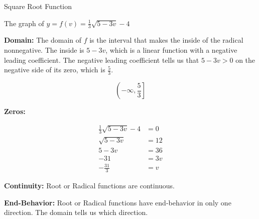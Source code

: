 \documentclass{ximera}
\begin{document}
\begin{example} Square Root Function

The graph of $y = f(v) = \frac{1}{3} \sqrt{5-3v}-4$


\begin{image}
\end{image}

\textbf{Domain:} The domain of $f$ is the interval that makes the inside of the radical nonnegative.  The inside is $5-3v$, which is a linear function with a negative leading coefficient. The negative leading coefficient tells us that $5-3v > 0$ on the negative side of its zero, which is $\frac{5}{3}$.

\[ \left(-\infty, \frac{5}{3} \right] \]

\textbf{Zeros:}


\begin{align*}
\frac{1}{3} \sqrt{5-3v}-4 & = 0   \\
\sqrt{5-3v}               & = 12  \\
5-3v                      & = 36  \\
-31 &= 3v   \\
-\frac{31}{3}   &= v
\end{align*}


\textbf{Continuity:} Root or Radical functions are continuous.


\textbf{End-Behavior:} Root or Radical functions have end-behavior in only one direction. The domain tells us which direction.  


\end{example}
\end{document}
